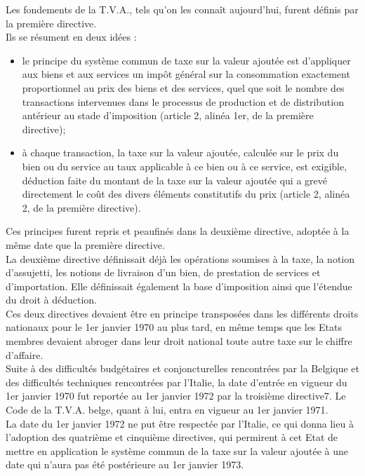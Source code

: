 \documentclass{book}
\begin{document}
Les fondements de la T.V.A., tels qu'on les connaît aujourd'hui, furent définis par la première
directive.\\

Ils se résument en deux idées :\\

\begin{itemize}
\item le principe du système commun de taxe sur la valeur ajoutée est d'appliquer aux
biens et aux services un impôt général sur la consommation exactement
proportionnel au prix des biens et des services, quel que soit le nombre des
transactions intervenues dans le processus de production et de distribution
antérieur au stade d'imposition (article 2, alinéa 1er, de la première directive);
\item à chaque transaction, la taxe sur la valeur ajoutée, calculée sur le prix du bien ou
du service au taux applicable à ce bien ou à ce service, est exigible, déduction faite
du montant de la taxe sur la valeur ajoutée qui a grevé directement le coût des
divers éléments constitutifs du prix (article 2, alinéa 2, de la première directive).
\end{itemize}
\null
Ces principes furent repris et peaufinés dans la deuxième directive, adoptée à la même date
que la première directive.\\

La deuxième directive définissait déjà les opérations soumises à la taxe, la notion d'assujetti,
les notions de livraison d'un bien, de prestation de services et d'importation. Elle définissait
également la base d'imposition ainsi que l'étendue du droit à déduction.\\

Ces deux directives devaient être en principe transposées dans les différents droits nationaux
pour le 1er janvier 1970 au plus tard, en même temps que les Etats membres devaient abroger
dans leur droit national toute autre taxe sur le chiffre d’affaire.\\

Suite à des difficultés budgétaires et conjoncturelles rencontrées par la Belgique et des
difficultés techniques rencontrées par l'Italie, la date d'entrée en vigueur du 1er janvier 1970
fut reportée au 1er janvier 1972 par la troisième directive7. Le Code de la T.V.A. belge, quant
à lui, entra en vigueur au 1er janvier 1971.\\

La date du 1er janvier 1972 ne put être respectée par l'Italie, ce qui donna lieu à l'adoption des
quatrième et cinquième directives, qui permirent à cet Etat de mettre en application le système
commun de la taxe sur la valeur ajoutée à une date qui n'aura pas été postérieure au 1er janvier
1973.
\end{document}
